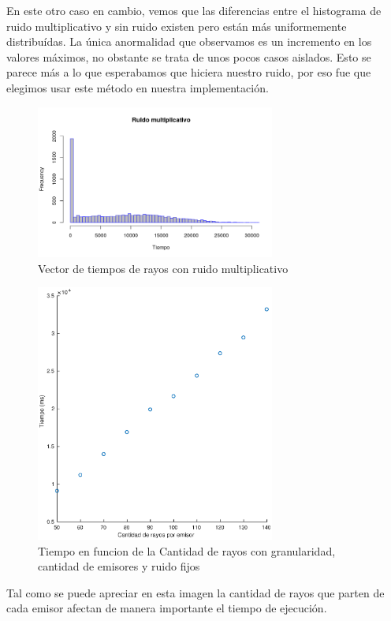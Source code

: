 \par En este otro caso en cambio, vemos que las diferencias entre el histograma de ruido multiplicativo y sin ruido existen pero están más uniformemente distribuídas. La única anormalidad que observamos es un incremento en los valores máximos, no obstante se trata de unos pocos casos aislados.
Esto se parece más a lo que esperabamos que hiciera nuestro ruido, por eso fue que elegimos usar este método en nuestra implementación.
\begin{figure}[H]
	\centering	\includegraphics[width=0.7\textwidth]{img/ruidoMultiplicativo.png}
	\caption{Vector de tiempos de rayos con ruido multiplicativo}
	\label{fig:etiqueta}
\end{figure}



\begin{figure}[H]
	\centering	\includegraphics[width=0.7\textwidth]{img/cantrayos_tiempo}
	\caption{Tiempo en funcion de la Cantidad de rayos con granularidad, cantidad de emisores y ruido fijos}
	\label{fig:cantrayos_tiempo}
\end{figure}
\par Tal como se puede apreciar en esta imagen la cantidad de rayos que parten de cada emisor afectan de manera importante el tiempo de ejecuci\'on.


